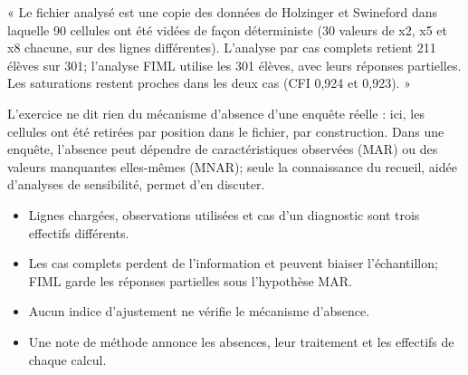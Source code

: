 \documentclass[
  french,
  11pt,
  a4paper,
  DIV=11,
  numbers=noendperiod]{scrreprt}
\providecommand{\tightlist}{%
  \setlength{\itemsep}{0pt}\setlength{\parskip}{0pt}}
\begin{document}
\begin{tcolorbox}[enhanced jigsaw, arc=.35mm, bottomrule=.15mm, bottomtitle=1mm, breakable, colback=white, colbacktitle=quarto-callout-tip-color!10!white, colframe=quarto-callout-tip-color-frame, coltitle=black, left=2mm, leftrule=.75mm, opacityback=0, opacitybacktitle=0.6, rightrule=.15mm, title={Réponse}, titlerule=0mm, toprule=.15mm, toptitle=1mm]

« Le fichier analysé est une copie des données de Holzinger et Swineford
dans laquelle 90 cellules ont été vidées de façon déterministe (30
valeurs de x2, x5 et x8 chacune, sur des lignes différentes). L'analyse
par cas complets retient 211 élèves sur 301; l'analyse FIML utilise les
301 élèves, avec leurs réponses partielles. Les saturations restent
proches dans les deux cas (CFI 0,924 et 0,923). »

L'exercice ne dit rien du mécanisme d'absence d'une enquête réelle :
ici, les cellules ont été retirées par position dans le fichier, par
construction. Dans une enquête, l'absence peut dépendre de
caractéristiques observées (MAR) ou des valeurs manquantes elles-mêmes
(MNAR); seule la connaissance du recueil, aidée d'analyses de
sensibilité, permet d'en discuter.

\end{tcolorbox}

\begin{tcolorbox}[enhanced jigsaw, arc=.35mm, bottomrule=.15mm, bottomtitle=1mm, breakable, colback=white, colbacktitle=quarto-callout-important-color!10!white, colframe=quarto-callout-important-color-frame, coltitle=black, left=2mm, leftrule=.75mm, opacityback=0, opacitybacktitle=0.6, rightrule=.15mm, title={À retenir}, titlerule=0mm, toprule=.15mm, toptitle=1mm]

\begin{itemize}
\tightlist
\item
  Lignes chargées, observations utilisées et cas d'un diagnostic sont
  trois effectifs différents.
\item
  Les cas complets perdent de l'information et peuvent biaiser
  l'échantillon; FIML garde les réponses partielles sous l'hypothèse
  MAR.
\item
  Aucun indice d'ajustement ne vérifie le mécanisme d'absence.
\item
  Une note de méthode annonce les absences, leur traitement et les
  effectifs de chaque calcul.
\end{itemize}

\end{tcolorbox}
\end{document}
